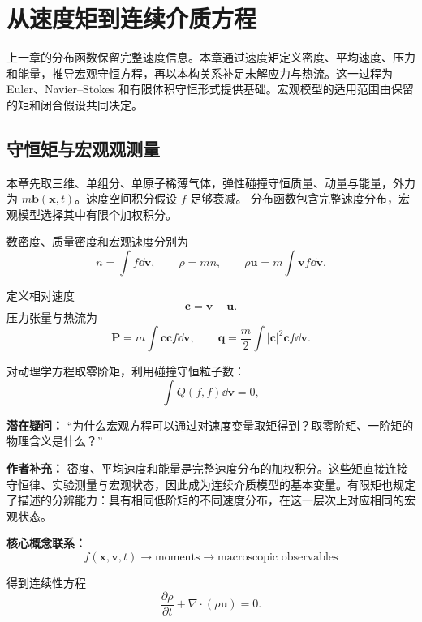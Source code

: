 \chapter{从速度矩到连续介质方程}\label{ch:2}

\begin{chaptersummary}
上一章的分布函数保留完整速度信息。本章通过速度矩定义密度、平均速度、压力和能量，推导宏观守恒方程，再以本构关系补足未解应力与热流。这一过程为 Euler、Navier--Stokes 和有限体积守恒形式提供基础。宏观模型的适用范围由保留的矩和闭合假设共同决定。
\end{chaptersummary}

\section{守恒矩与宏观观测量}
本章先取三维、单组分、单原子稀薄气体，弹性碰撞守恒质量、动量与能量，外力为 $m\bm b(\bm x,t)$。速度空间积分假设 $f$ 足够衰减。
分布函数包含完整速度分布，宏观模型选择其中有限个加权积分。

数密度、质量密度和宏观速度分别为
\[
n=\int f\dd\bm v,
\qquad
\rho=mn,
\qquad
\rho\bm u=m\int \bm v f\dd\bm v.
\]

定义相对速度
\[
\bm c=\bm v-\bm u.
\]
压力张量与热流为
\[
\bm P=m\int \bm c\bm c f\dd\bm v,
\qquad
\bm q=\frac{m}{2}\int |\bm c|^2\bm c f\dd\bm v.
\]

对动理学方程取零阶矩，利用碰撞守恒粒子数：
\[
\int Q(f,f)\dd\bm v=0,
\]

\begin{authornote}
\textbf{潜在疑问：}
“为什么宏观方程可以通过对速度变量取矩得到？取零阶矩、一阶矩的物理含义是什么？”

\textbf{作者补充：}
密度、平均速度和能量是完整速度分布的加权积分。这些矩直接连接守恒律、实验测量与宏观状态，因此成为连续介质模型的基本变量。有限矩也规定了描述的分辨能力：具有相同低阶矩的不同速度分布，在这一层次上对应相同的宏观状态。

\textbf{核心概念联系：}
\[
f(\bm x,\bm v,t)
\longrightarrow
\text{moments}
\longrightarrow
\text{macroscopic observables}
\]
\end{authornote}

得到连续性方程
\[
\boxed{
\frac{\partial\rho}{\partial t}
+\nabla\cdot(\rho\bm u)=0
}.
\]

